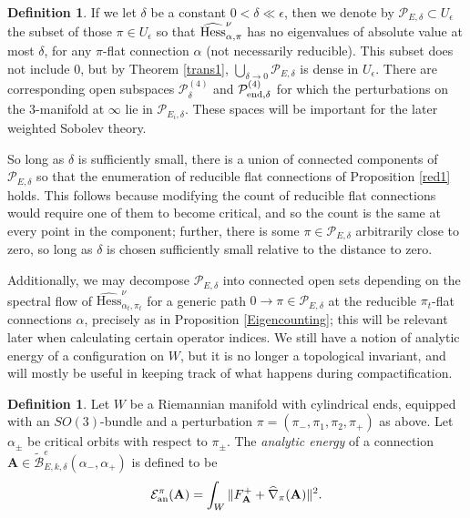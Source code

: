 \documentclass{memo-l}
\theoremstyle{definition}
\newtheorem{definition}[theorem]{Definition}
\theoremstyle{remark}
\numberwithin{section}{chapter}
\numberwithin{equation}{chapter}
\begin{document}
\begin{definition}
If we let $\delta$ be a constant $0 < \delta \ll \epsilon$, then we denote by $\mathcal P_{E,\delta} \subset U_\epsilon$ the subset of those $\pi \in U_\epsilon$ so that $\widehat{\textup{Hess}}^\nu_{\alpha,\pi}$ has no eigenvalues of absolute value at most $\delta$, for any $\pi$-flat connection $\alpha$ (not necessarily reducible). This subset does not include $0$, but by Theorem \ref{trans1}, $\bigcup_{\delta \to 0} \mathcal P_{E, \delta}$ is dense in $U_\epsilon$. There are corresponding open subspaces $\mathcal P^{(4)}_\delta$ and $\mathcal P^{(4)}_{\textup{end}, \delta}$ for which the perturbations on the 3-manifold at $\infty$ lie in $\mathcal P_{E_i, \delta}$. These spaces will be important for the later weighted Sobolev theory. 
\end{definition}

So long as $\delta$ is sufficiently small, there is a union of connected components of $\mathcal P_{E,\delta}$ so that the enumeration of reducible flat connections of Proposition \ref{red1} holds. This follows because modifying the count of reducible flat connections would require one of them to become critical, and so the count is the same at every point in the component; further, there is some $\pi \in \mathcal P_{E,\delta}$ arbitrarily close to zero, so long as $\delta$ is chosen sufficiently small relative to the distance to zero. 

Additionally, we may decompose $\mathcal P_{E, \delta}$ into connected open sets depending on the spectral flow of $\widehat{\text{Hess}}^\nu_{\alpha_t, \pi_t}$ for a generic path $0 \to \pi \in \mathcal P_{E, \delta}$ at the reducible $\pi_t$-flat connections $\alpha$, precisely as in Proposition \ref{Eigencounting}; this will be relevant later when calculating certain operator indices.
We still have a notion of analytic energy of a configuration on $W$, but it is no longer a topological invariant, and will mostly be useful in keeping track of what happens during compactification.

\begin{definition}Let $W$ be a Riemannian manifold with cylindrical ends, equipped with an $SO(3)$-bundle and a perturbation $\pi = (\pi_-, \pi_1, \pi_2, \pi_+)$ as above. Let $\alpha_\pm$ be critical orbits with respect to $\pi_\pm$. The \emph{analytic energy} of a connection $\mathbf{A} \in \widetilde{\mathcal B}^{e}_{E,k,\delta}(\alpha_-,\alpha_+)$ is defined to be $$\mathcal E^\pi_{\textup{an}}(\mathbf{A}) = \int_W \|F^+_{\mathbf{A}} + \widehat{\nabla}_\pi(\mathbf{A})\|^2.$$
\end{definition}
\end{document}

